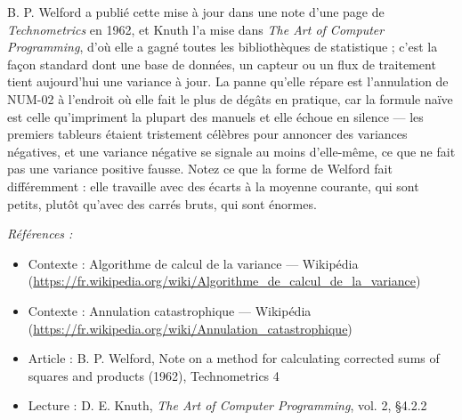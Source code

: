 \documentclass[11pt]{article}
\newenvironment{refs}{\par\small\noindent\emph{Références :}\begin{itemize}\setlength\itemsep{0pt}}{\end{itemize}\normalsize}
\begin{document}
\noindent B. P. Welford a publié cette mise à jour dans une note d'une page de \textit{Technometrics} en 1962, et Knuth l'a mise dans \textit{The Art of Computer Programming}, d'où elle a gagné toutes les bibliothèques de statistique ; c'est la façon standard dont une base de données, un capteur ou un flux de traitement tient aujourd'hui une variance à jour. La panne qu'elle répare est l'annulation de NUM-02 à l'endroit où elle fait le plus de dégâts en pratique, car la formule naïve est celle qu'impriment la plupart des manuels et elle échoue en silence --- les premiers tableurs étaient tristement célèbres pour annoncer des variances négatives, et une variance négative se signale au moins d'elle-même, ce que ne fait pas une variance positive fausse. Notez ce que la forme de Welford fait différemment : elle travaille avec des écarts à la moyenne courante, qui sont petits, plutôt qu'avec des carrés bruts, qui sont énormes.

\begin{refs}
\item Contexte : Algorithme de calcul de la variance --- Wikipédia (\url{https://fr.wikipedia.org/wiki/Algorithme_de_calcul_de_la_variance})
\item Contexte : Annulation catastrophique --- Wikipédia (\url{https://fr.wikipedia.org/wiki/Annulation_catastrophique})
\item Article : B. P. Welford, \og{} Note on a method for calculating corrected sums of squares and products \fg{} (1962), Technometrics 4
\item Lecture : D. E. Knuth, \textit{The Art of Computer Programming}, vol. 2, \S{}4.2.2
\end{refs}

\bigskip
\end{document}
